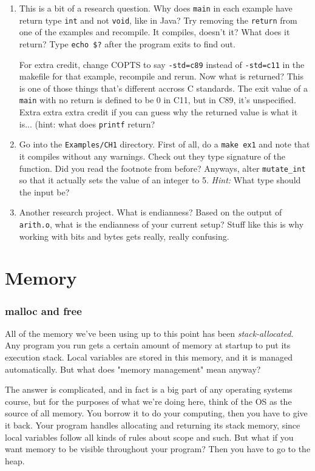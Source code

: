 \documentclass[ebook,11pt,oneside,openany]{memoir}
\newcommand{\cf}[1]{\texttt{#1}}
\begin{document}
\begin{enumerate}
\item This is a bit of a research question. Why does \texttt{main} in each example have return type \texttt{int} and not \texttt{void}, like in Java? Try removing the \texttt{return} from one of the examples and recompile.  It compiles, doesn't it? What does it return? Type \texttt{echo \$?} after the program exits to find out.

For extra credit, change COPTS to say \texttt{-std=c89} instead of \cf{-std=c11} in the makefile for that example, recompile and rerun. Now what is returned? This is one of those things that's different accross C standards. The exit value of a \texttt{main} with no return is defined to be 0 in C11, but in C89, it's unspecified. Extra extra extra credit if you can guess why the returned value is what it is... (hint: what does \cf{printf} return?

\item Go into the \cf{Examples/CH1} directory. First of all, do a \texttt{make ex1} and note that it compiles without any warnings. Check out they type signature of the function. Did you read the footnote from before? Anyways, alter \texttt{mutate\_int} so that it actually sets the value of an integer to 5. \textit{Hint:} What type should the input be?

\item Another research project. What is endianness? Based on the output of \texttt{arith.o}, what is the endianness of your current setup? Stuff like this is why working with bits and bytes gets really, really confusing.
\end{enumerate}


\chapter{Memory}
\subsection{malloc and free}
All of the memory we've been using up to this point has been \textit{stack-allocated}. Any program you run gets a certain amount of memory at startup to put its execution stack. Local variables are stored in this memory, and it is managed automatically. But what does "memory management" mean anyway? 

The answer is complicated, and in fact is a big part of any operating systems course, but for the purposes of what we're doing here, think of the OS as the source of all memory. You borrow it to do your computing, then you have to give it back. Your program handles allocating and returning its stack memory, since local variables follow all kinds of rules about scope and such. But what if you want memory to be visible throughout your program? Then you have to go to the heap.
\end{document}
